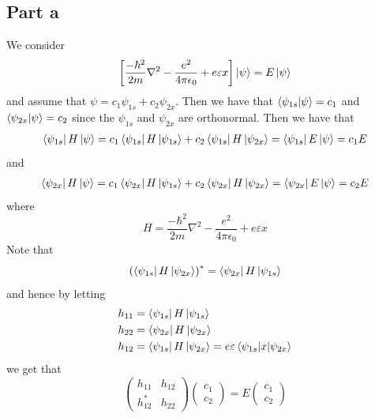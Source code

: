 \documentclass[12pt]{report}
\begin{document}
\subsection*{Part a}
We consider 
\begin{equation*}
  \left[\frac{-\hbar^2}{2m} \nabla^2 - \frac{e^2}{4\pi \epsilon_0} + e \varepsilon x\right] \ket{\psi} = E \ket{\psi}
\end{equation*}
and assume that $\psi = c_1 \psi_{1s} + c_2 \psi_{2x}$. Then we have that
$\braket{\psi_{1s}|\psi} = c_1$ and $\braket{\psi_{2x}|\psi} = c_2$ since the $\psi_{1s}$ and $\psi_{2x}$ are orthonormal. Then we have that
\begin{align*}
\bra{\psi_{1s}}H\ket{\psi} = c_1\bra{\psi_{1s}}H\ket{\psi_{1s}} + c_2\bra{\psi_{1s}}H\ket{\psi_{2x}} = \bra{\psi_{1s}} E \ket{\psi} = c_1 E\\
\end{align*}
and
\begin{align*}
  \bra{\psi_{2x}}H\ket{\psi} = c_1\bra{\psi_{2x}}H\ket{\psi_{1s}} + c_2\bra{\psi_{2x}}H\ket{\psi_{2x}}   &= \bra{\psi_{2x}} E \ket{\psi} = c_2E\\
\end{align*}
where 
\begin{equation*}
  H =\frac{-\hbar^2}{2m} \nabla^2 - \frac{e^2}{4\pi \epsilon_0} + e \varepsilon x
\end{equation*}
Note that
\begin{equation*}
  \left(\bra{\psi_{1s}}H\ket{\psi_{2x}} \right)^* = \bra{\psi_{2x}}H\ket{\psi_{1s}}
\end{equation*}
and hence by letting
\begin{align*}
  h_{11} &= \bra{\psi_{1s}}H\ket{\psi_{1s}} \\
  h_{22} &= \bra{\psi_{2x}}H\ket{\psi_{2x}} \\
  h_{12} &= \bra{\psi_{1s}}H\ket{\psi_{2x}} = e\varepsilon \braket{\psi_{1s}|x|\psi_{2x}}
\end{align*}
we get that
\begin{equation*}
  \begin{pmatrix}
    h_{11} & h_{12} \\
    h_{12}^* & h_{22}
  \end{pmatrix}
  \begin{pmatrix}
    c_1 \\
    c_2
  \end{pmatrix}
  = E
  \begin{pmatrix}
    c_1 \\
    c_2
  \end{pmatrix}
\end{equation*}
\end{document}
